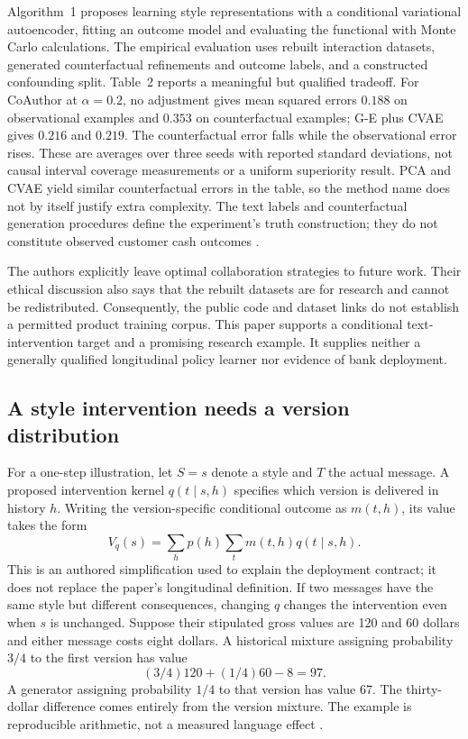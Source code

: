 Algorithm~1 proposes learning style representations with a conditional
variational autoencoder, fitting an outcome model and evaluating the
functional with Monte Carlo calculations.
The empirical evaluation uses rebuilt interaction datasets, generated
counterfactual refinements and outcome labels, and a constructed
confounding split. Table~2 reports a meaningful but qualified tradeoff.
For CoAuthor at $\alpha=0.2$, no adjustment gives mean squared errors
$0.188$ on observational examples and $0.353$ on counterfactual examples;
G-E plus CVAE gives $0.216$ and $0.219$. The counterfactual error falls
while the observational error rises. These are averages over three seeds
with reported standard deviations, not causal interval coverage
measurements or a uniform superiority result. PCA and CVAE yield similar
counterfactual errors in the table, so the method name does not by itself
justify extra complexity. The text labels and counterfactual generation
procedures define the experiment's truth construction; they do not
constitute observed customer cash outcomes
\citep{exec13_census_collaboration}.

The authors explicitly leave optimal collaboration strategies to future
work. Their ethical discussion also says that the rebuilt datasets are for
research and cannot be redistributed. Consequently, the public code and
dataset links do not establish a permitted product training corpus.
This paper supports a conditional text-intervention target and a promising
research example. It supplies neither a generally qualified longitudinal
policy learner nor evidence of bank deployment.

\subsection{A style intervention needs a version distribution}

For a one-step illustration, let $S=s$ denote a style and $T$ the actual
message. A proposed intervention kernel $q(t\mid s,h)$ specifies which
version is delivered in history $h$. Writing the version-specific
conditional outcome as $m(t,h)$, its value takes the form
\[
 V_q(s)=\sum_h p(h)\sum_t m(t,h)q(t\mid s,h).
\]
This is an authored simplification used to explain the deployment contract;
it does not replace the paper's longitudinal definition.
If two messages have the same style but different consequences,
changing $q$ changes the intervention even when $s$ is unchanged.
Suppose their stipulated gross values are 120 and 60 dollars and either
message costs eight dollars. A historical mixture assigning probability
$3/4$ to the first version has value
\[
 (3/4)120+(1/4)60-8=97.
\]
A generator assigning probability $1/4$ to that version has value 67.
The thirty-dollar difference comes entirely from the version mixture.
The example is reproducible arithmetic, not a measured language effect
\citep{exec16_longpolicy_oracle}.

